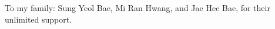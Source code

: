 \begin{dedication}
    To my family: Sung Yeol Bae, Mi Ran Hwang, and Jae Hee Bae, for their unlimited support.
\end{dedication}